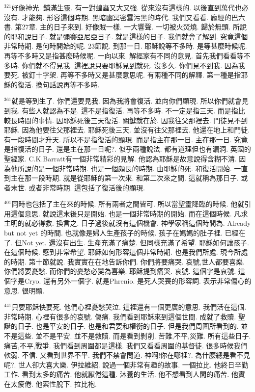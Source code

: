 \documentclass{book}
\begin{document}
$^{321}$好像神光.
鋪滿生靈.
有一對蝗蟲又大又強.
從來沒有這樣的.
以後直到萬代也必沒有.
才能夠.
形容這個時期.
黑暗幽冥密雲污黑的時代.
我們又看看.
龐經的巴六書.
第27章.
主的日子來到.
好像賊一樣.
一大響聲.
一切被火焚燒.
歸於無頭.
所說的耶和說日子.
就是彌賽亞尼亞日子.
就是這樣的日子.
我們就會了解到.
究竟這個非常時期.
是何時開始的呢.
23節說.
到那一日.
耶穌說等不多時.
是等甚麼時候呢.
再等不多時又是指甚麼時候呢.
一向以來.
解經家有不同的意見.
首先我們看看等不多時.
你們就不得見我.
這裡說只要耶穌見到就死.
沒多久.
你們見不到我.
因為我要死.
被釘十字架.
再等不多時又是甚麼意思呢.
有兩種不同的解釋.
第一種是指耶穌的復活.
換句話說再等不多時.

$^{361}$就是等到生了.
你們還要見我.
因為我將會復活.
並向你們顯現.
所以你們就會見到我.
有些人就認為不是.
這不是指復活.
再等不多時.
不一定是指三天.
而是指比較長時間的事情.
因耶穌死後三天復活.
關鍵就在於.
因我往父那裡去.
門徒見不到耶穌.
因為他要往父那裡去.
耶穌死後三天.
並沒有往父那裡去.
他還在地上和門徒.
有一段時間才升天.
所以不是指復活的顯現.
而是指主在那一日.
主在那一日.
究竟是指復活的日子.
還是主在那一日呢?.
似乎兩種說法.
都有道理但也有漏洞.
英國的聖經家.
C.K.Barratt有一個非常精彩的見解.
他認為耶穌是故意說得含糊不清.
因為他所說的是一個非常時期.
也是一個頗長的時期.
由耶穌的死.
和復活開始.
一直到主在那一段時期.
就是從耶穌的第一次來.
和第二次來之間.
這就稱為那日子.
或者末世.
或者非常時期.
這包括了復活後的顯現.

$^{401}$同時也包括了主在來的時候.
所有兩者之間皆可.
所以當聖靈降臨的時候.
他就引用這個意思.
就說這末後只是開始.
也是一個非常時期的開始.
而在這個時候.
凡求主明的就必得救.
換言之.
日子過後就沒有這個機會.
神學家稱這個時間為.
Already but not yet 的時間.
也就像是婦人生產孩子的時候.
孩子在媽媽的肚子裡.
已經在了.
但Not yet.
還沒有出生.
生產充滿了痛楚.
但同樣充滿了希望.
耶穌如何讓孩子.
在這個時候.
感到非常希望.
耶穌如何形容這個非常時期.
也是我們所處.
現今所處的時期.
第十節就說.
我實實在在地告訴你們.
你們將要痛哭.
哀號,世人都要喜樂.
你們將要憂愁.
而你們的憂愁必變為喜樂.
耶穌提到痛哭.
哀號.
這個字是哀號.
這個字是Cryo.
還有另外一個字.
就是Phrenio.
是死人哭喪的形容詞.
表示非常傷心的意思.
很明顯.

$^{441}$只要耶穌快要死.
他們心裡憂愁哭泣.
這裡還有一個更廣的意思.
我們活在這個.
非常時期.
心裡有很多的哀號.
傷痛.
我們看到耶穌來到這個世間.
成就了救贖.
聖誕的日子.
也是平安的日子.
也是和君要和權衡的日子.
但是我們周圍所看到的.
並不是這些.
並不是平安.
並不是救贖.
而是看到剝削.
苦難,不平,災難.
所有這些日子.
痛苦,不平,戰爭.
我們看到周圍都是這樣.
我們又看看周圍的基督徒.
很多時候我們軟弱.
不信.
又看到世界不平.
我們不禁會問道.
神啊!你在哪裡?.
為什麼總是看不見呢?.
世人卻大喜大樂.
伊拉維紹.
說過一個非常有趣的故事.
一個拉比.
他終日辛勤工作.
看到太多的痛苦.
他就厭倦這種.
沐養的生活.
他不想看到人間的痛苦.
他實在太疲倦.
他索性脫下.
拉比袍.
\end{document}
